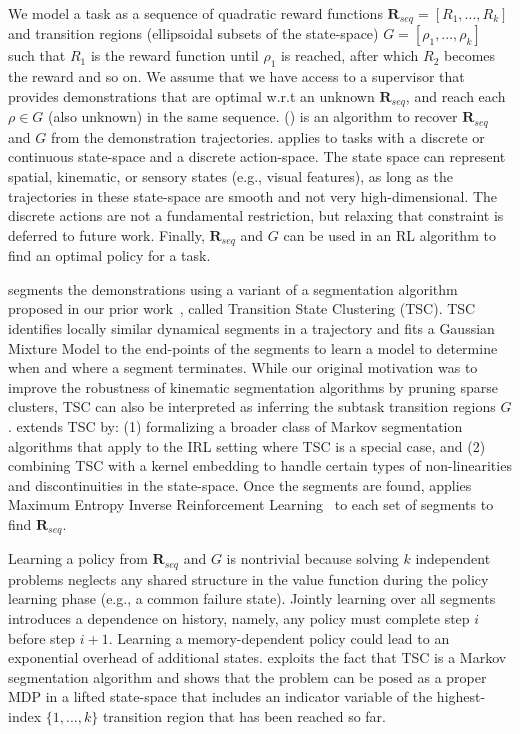 We model a task as a sequence of quadratic reward functions $\mathbf{R}_{seq}=[R_1,...,R_k]$ and transition regions (ellipsoidal subsets of the state-space) $G = [\rho_1, ...,\rho_k]$ such that $R_1$ is the reward function until $\rho_1$ is reached, after which $R_2$ becomes the reward and so on.
We assume that we have access to a supervisor that provides demonstrations that are optimal w.r.t an unknown $\mathbf{R}_{seq}$, and reach each $\rho \in G$ (also unknown) in the same sequence. 
\hirlfull (\hirl) is an algorithm to recover $\mathbf{R}_{seq}$ and $G$ from the demonstration trajectories.
\hirl applies to tasks with a discrete or continuous state-space and a discrete action-space.
The state space can represent spatial, kinematic, or sensory states (e.g., visual features), as long as the trajectories in these state-space are smooth and not very high-dimensional.
The discrete actions are not a fundamental restriction, but relaxing that constraint is deferred to future work.
Finally, $\mathbf{R}_{seq}$ and $G$ can be used in an RL algorithm to find an optimal policy for a task.

\hirl segments the demonstrations using a variant of a segmentation algorithm proposed in our prior work~\citep{krishnan2015tsc,murali2016}, called Transition State Clustering (TSC).
TSC identifies locally similar dynamical segments in a trajectory and fits a Gaussian Mixture Model to the end-points of the segments to learn a model to determine when and where a segment terminates.
While our original motivation was to improve the robustness of kinematic segmentation algorithms by pruning sparse clusters, TSC can also be interpreted as inferring the subtask transition regions $G$.
\hirl extends TSC by: (1) formalizing a broader class of Markov segmentation algorithms that apply to the IRL setting where TSC is a special case, and (2) combining TSC with a kernel embedding to handle certain types of non-linearities and discontinuities in the state-space.
Once the segments are found, \hirl applies Maximum Entropy Inverse Reinforcement Learning~\citep{DBLP:conf/aaai/ZiebartMBD08} to each set of segments to find $\mathbf{R}_{seq}$.

Learning a policy from $\mathbf{R}_{seq}$ and $G$ is nontrivial because solving $k$ independent problems neglects any shared structure in the value function during the policy learning phase (e.g., a common failure state).
Jointly learning over all segments introduces a dependence on history, namely, any policy must complete step $i$ before step $i+1$.
Learning a memory-dependent policy could lead to an exponential overhead of additional states. 
\hirl exploits the fact that TSC is a Markov segmentation algorithm and shows that the problem can be posed as a proper MDP in a lifted state-space that includes an indicator variable of the highest-index $\{1,...,k\}$ transition region that has been reached so far.

